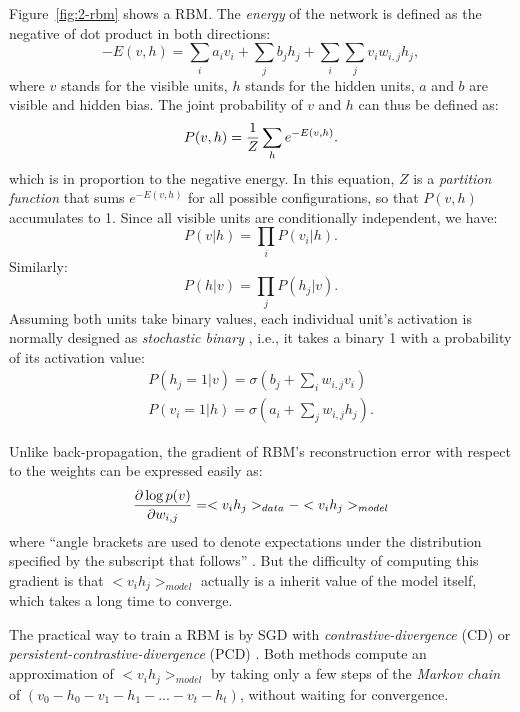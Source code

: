 Figure~\ref{fig:2-rbm} shows a RBM. The {\it energy} of the network is defined as the negative of dot product in both directions:
\begin{equation}
-E(v,h) = \sum_i a_iv_i + \sum_j b_jh_j + \sum_i\sum_j v_iw_{i,j}h_j,
\end{equation}
where $v$ stands for the visible units, $h$ stands for the hidden units, $a$ and $b$ are visible and hidden bias. The joint probability of $v$ and $h$ can thus be defined as:
\begin{equation}
P(v,h) = {1\over Z} \sum_h e^{-E(v,h)}.
\end{equation}
which is in proportion to the negative energy. In this equation, $Z$ is a {\it partition function} that sums $e^{-E(v,h)}$ for all possible configurations, so that $P(v,h)$ accumulates to 1. Since all visible units are conditionally independent, we have:
\begin{equation}
P(v|h) = \prod_i P(v_i|h).
\end{equation}
Similarly:
\begin{equation}
P(h|v) = \prod_j P(h_j|v).
\end{equation}
Assuming both units take binary values, each individual unit's activation is normally designed as {\it stochastic binary} \cite{hinton2010practical}, i.e., it takes a binary 1 with a probability of its activation value:
\begin{equation}
\begin{split}
P(h_j=1|v) = \sigma(b_j+\sum_i w_{i,j}v_i) \\
P(v_i=1|h) = \sigma(a_i+\sum_j w_{i,j}h_j).
\end{split}
\end{equation}

Unlike back-propagation, the gradient of RBM's reconstruction error with respect to the weights can be expressed easily as:
\begin{equation}
{\partial \log p(v) \over \partial w_{i,j}} = <v_ih_j>_{data} - <v_ih_j>_{model}
\end{equation}
where ``angle brackets are used to denote expectations under the distribution specified by the subscript that follows'' \cite{hinton2010practical}. But the difficulty of computing this gradient is that $<v_ih_j>_{model}$ actually is a inherit value of the model itself, which takes a long time to converge.

The practical way to train a RBM is by SGD with {\it contrastive-divergence} \cite{hinton2010practical} (CD) or {\it persistent-contrastive-divergence} (PCD) \cite{tieleman2008training}. Both methods compute an approximation of $<v_ih_j>_{model}$ by taking only a few steps of the {\it Markov chain} of $(v_0- h_0-v_1-h_1-...-v_t-h_t)$, without waiting for convergence.

